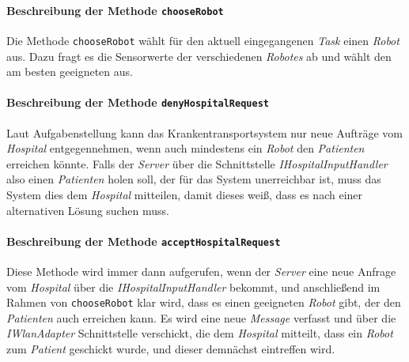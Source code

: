			\paragraph{Beschreibung der Methode \texttt{chooseRobot}}
			Die Methode \texttt{chooseRobot} wählt für den aktuell eingegangenen \emph{Task} einen \emph{Robot} aus. Dazu fragt es die Sensorwerte der verschiedenen \emph{Robotes} ab und wählt den am besten geeigneten aus.
			
			\paragraph{Beschreibung der Methode \texttt{denyHospitalRequest}}
			Laut Aufgabenstellung kann das Krankentransportsystem nur neue Aufträge vom \textit{Hospital} entgegennehmen, wenn auch mindestens ein \textit{Robot} den \textit{Patienten} erreichen könnte. Falls der \textit{Server} über die Schnittstelle \textit{IHospitalInputHandler} also einen \textit{Patienten} holen soll, der für das System unerreichbar ist, muss das System dies dem \textit{Hospital} mitteilen, damit dieses weiß, dass es nach einer alternativen Lösung suchen muss.
			
			
			\paragraph{Beschreibung der Methode \texttt{acceptHospitalRequest}}
			Diese Methode wird immer dann aufgerufen, wenn der \textit{Server} eine neue Anfrage vom \textit{Hospital} über die \textit{IHospitalInputHandler} bekommt, und anschließend im Rahmen von \texttt{chooseRobot} klar wird, dass es einen geeigneten \textit{Robot} gibt, der den \textit{Patienten} auch erreichen kann. Es wird eine neue \textit{Message} verfasst und über die \textit{IWlanAdapter} Schnittstelle verschickt, die dem \textit{Hospital} mitteilt, dass ein \textit{Robot} zum \textit{Patient} geschickt wurde, und dieser demnächst eintreffen wird.
